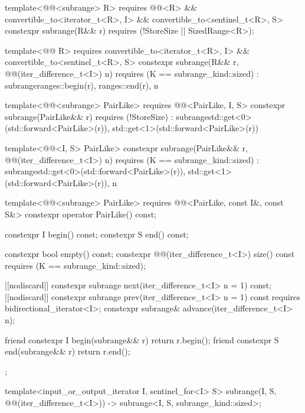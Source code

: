 \begin{codeblock}
{{    template<@@<subrange> R>
      requires @@<R> &&
        convertible_to<iterator_t<R>, I> && convertible_to<sentinel_t<R>, S>
    constexpr subrange(R&& r) requires (!StoreSize || SizedRange<R>);

    template<@@ R>
      requires convertible_to<iterator_t<R>, I> && convertible_to<sentinel_t<R>, S>
    constexpr subrange(R&& r, @@(iter_difference_t<I>) n)
      requires (K == subrange_kind::sized)
        : subrange{ranges::begin(r), ranges::end(r), n}
    {}

    template<@@<subrange> PairLike>
      requires @@<PairLike, I, S>
    constexpr subrange(PairLike&& r) requires (!StoreSize)
      : subrange{std::get<0>(std::forward<PairLike>(r)),
                 std::get<1>(std::forward<PairLike>(r))}
    {}

    template<@@<I, S> PairLike>
    constexpr subrange(PairLike&& r, @@(iter_difference_t<I>) n)
      requires (K == subrange_kind::sized)
      : subrange{std::get<0>(std::forward<PairLike>(r)),
                 std::get<1>(std::forward<PairLike>(r)), n}
    {}

    template<@@<subrange> PairLike>
      requires @@<PairLike, const I&, const S&>
    constexpr operator PairLike() const;

    constexpr I begin() const;
    constexpr S end() const;

    constexpr bool empty() const;
    constexpr @@(iter_difference_t<I>) size() const
      requires (K == subrange_kind::sized);

    [[nodiscard]] constexpr subrange next(iter_difference_t<I> n = 1) const;
    [[nodiscard]] constexpr subrange prev(iter_difference_t<I> n = 1) const
      requires bidirectional_iterator<I>;
    constexpr subrange& advance(iter_difference_t<I> n);

    friend constexpr I begin(subrange&& r) { return r.begin(); }
    friend constexpr S end(subrange&& r) { return r.end(); }
  };

  template<input_or_output_iterator I, sentinel_for<I> S>
    subrange(I, S, @@(iter_difference_t<I>)) ->
      subrange<I, S, subrange_kind::sized>;

}
\end{codeblock}
